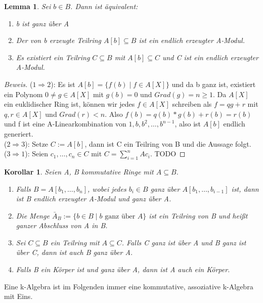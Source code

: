 \documentclass{article}
\newtheorem{lemma}[satz]{Lemma}
\newtheorem{korollar}[satz]{Korollar}
\begin{document}
	\begin{lemma}
	Sei \(b \in B\). Dann ist äquivalent:
	\begin{enumerate}
	\item b ist ganz über A
	\item Der von b erzeugte Teilring \(A[b] \subseteq B\) ist ein endlich
	erzeugter A-Modul.
	\item Es existiert ein Teilring \(C \subseteq B\) mit \(A[b] \subseteq C\)
	und C ist ein endlich erzeugter A-Modul.
	\end{enumerate}
	\end{lemma}

	\begin{proof}[Beweis]
	(\(1 \Rightarrow 2\)): Es ist \(A[b] = \{f(b)\;|\;f\in A[X]\}\)
	und da b ganz ist, existiert ein Polynom \(0 \neq g \in A[X]\) mit \(g(b) 
	= 0\) und \(Grad(g) = n \geq 1\). Da \(A[X]\) ein euklidischer Ring ist, können
	wir jedes \(f \in A[X]\) schreiben als \(f = qg + r\) mit \(q,r \in A[X]\)
	und \(Grad(r) < n\). Also \(f(b) = q(b)*g(b) + r(b) = r(b)\) und f ist eine
	A-Linearkombination von \(1, b, b^2, \ldots, b^{n-1}\), also ist \(A[b]\)
	endlich generiert. \\
	(\(2 \Rightarrow 3\)): Setze \(C := A[b]\), dann ist C ein Teilring von B
	und die Aussage folgt. \\
	(\(3 \Rightarrow 1\)): Seien \(c_1, \ldots, c_n \in C\) mit \(C =
	\sum_{i=1}^n Ac_i\). TODO
	\end{proof}

	\begin{korollar}
	Seien A, B kommutative Ringe mit \(A \subseteq B\).
	\begin{enumerate}
	\item Falls \(B = A[b_1, \ldots, b_n]\), wobei jedes \(b_i \in B\) ganz über
	\(A[b_1, \ldots, b_{i-1}]\) ist, dann ist B endlich erzeugter A-Modul und 
	ganz über A.
	\item Die Menge \(\bar{A}_B := \{b \in B\;|\;b \text{ ganz über } A\}\) ist
	ein Teilring von B und heißt ganzer Abschluss von A in B.
	\item Sei \(C \subseteq B\) ein Teilring mit \(A \subseteq C\). Falls C
	ganz ist über A und B ganz ist über C, dann ist auch B ganz über A.
	\item Falls B ein Körper ist und ganz über A, dann ist A auch ein Körper.
	\end{enumerate}
	\end{korollar}

	Eine k-Algebra ist im Folgenden immer eine kommutative, assoziative
	k-Algebra mit Eins.
\end{document}
